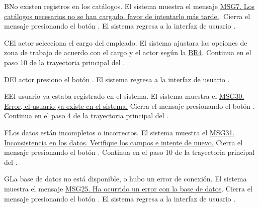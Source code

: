 \begin{UCtrayectoriaA}{B}{No existen registros en los catálogos.}
    \UCpaso El sistema muestra el mensaje \hyperref[MSG7]{MSG7. Los catálogos necesarios no se han cargado, favor de intentarlo más tarde.}.
	\UCpaso[\UCactor] Cierra el mensaje presionando el botón .
     \UCpaso El sistema regresa a la interfaz de usuario .
\end{UCtrayectoriaA}

\begin{UCtrayectoriaA}{C}{El actor selecciona el cargo del empleado.}
    \UCpaso     El sistema ajustara las opciones de zona de trabajo de acuerdo con el cargo y el actor según la \hyperlink{reglas-BR4}{BR4}.
    \UCpaso Continua en el paso 10 de la trayectoria principal del .
\end{UCtrayectoriaA}

\begin{UCtrayectoriaA}{D}{El actor presiono el botón .}
 \UCpaso El sistema regresa a la interfaz de usuario .
\end{UCtrayectoriaA}

\begin{UCtrayectoriaA}{E}{El usuario ya estaba registrado en el sistema.}
 \UCpaso El sistema muestra el \hyperref[MSG30]{MSG30. Error, el usuario ya existe en el sistema.} 
 \UCpaso[\UCactor] Cierra el mensaje presionando el botón .
 \UCpaso Continua en el paso 4 de la trayectoria principal del .
\end{UCtrayectoriaA}

\begin{UCtrayectoriaA}{F}{Los datos están incompletos o incorrectos.}
 \UCpaso El sistema muestra el \hyperref[MSG31]{MSG31. Inconsistencia en los datos. Verifique los campos e intente de nuevo.}
 \UCpaso[\UCactor] Cierra el mensaje presionando el botón .
 \UCpaso Continua en el paso 10 de la trayectoria principal del .
\end{UCtrayectoriaA}


\begin{UCtrayectoriaA}{G}{La base de datos no está disponible, o hubo un error de conexión.}
    \UCpaso El sistema muestra el mensaje \hyperref[MSG25]{MSG25. Ha ocurrido un error con la base de datos}.
    \UCpaso[\UCactor] Cierra el mensaje presionando el botón .
     \UCpaso El sistema regresa a la interfaz de usuario .
\end{UCtrayectoriaA}

